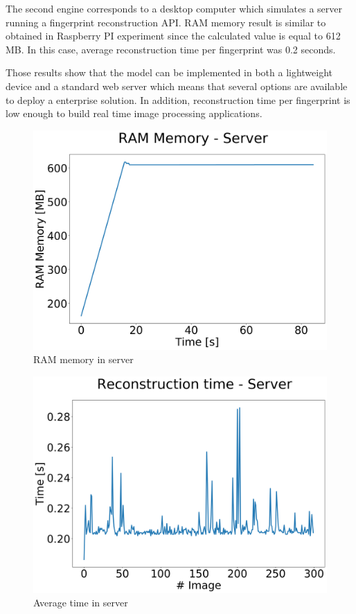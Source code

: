 \documentclass[a4paper,fleqn]{cas-dc}
\begin{document}
The second engine corresponds to a desktop computer which simulates a server running a fingerprint reconstruction API. RAM memory result is similar to obtained in Raspberry PI experiment since the calculated value is equal to 612 MB. In this case, average reconstruction time per fingerprint was 0.2 seconds.

Those results show that the model can be implemented in both a lightweight device and a standard web server which means that several options are available to deploy a enterprise solution. In addition, reconstruction time per fingerprint is low enough to build real time image processing applications.

\begin{figure}[htbp]
\centerline{\includegraphics[scale=0.22]{figs/RAM Server.png}}
\caption{RAM memory in server}
\label{fig11}
\end{figure}

\begin{figure}[htbp]
\centerline{\includegraphics[scale=0.22]{figs/Time Server.png}}
\caption{Average time in server}
\label{fig11}
\end{figure}
\end{document}
